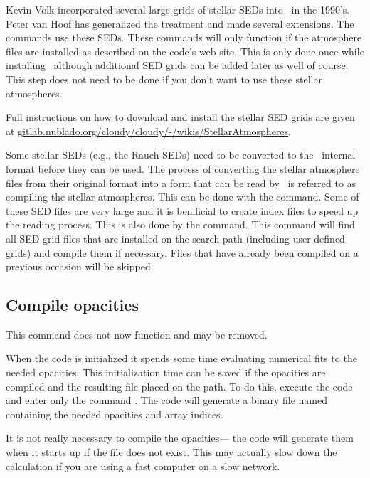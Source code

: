 Kevin Volk incorporated several large grids of stellar SEDs
into \Cloudy\ in the 1990's.
Peter van Hoof has generalized the treatment
and made several extensions.
The  commands use these SEDs.
These commands will only function
if the atmosphere files
are installed as described on the code's web site.
This is only done once
while installing \Cloudy\ although additional SED grids
can be added later as well of course.
This step does not need to be done if
you don't want to use these stellar atmospheres.

Full instructions on how to download and install the stellar SED grids
are given at
\href{https://gitlab.nublado.org/cloudy/cloudy/-/wikis/StellarAtmospheres}{gitlab.nublado.org/cloudy/cloudy/-/wikis/StellarAtmospheres}.

Some stellar SEDs (e.g., the Rauch SEDs) need to be converted to the
\Cloudy\ internal format before they can be used.
The process of converting the
stellar atmosphere files from their original format into a form that can
be read by \Cloudy\ is referred to as compiling the stellar atmospheres.
This can be done with the  command.
Some of these SED files are very large and it is benificial to
create index files to speed up the reading process. This is also done by
the  command. This command will find all
SED grid files that are installed on the search path (including
user-defined grids) and compile them if necessary. Files that have
already been compiled on a previous occasion will be skipped.

\begin{shaded}
\section{Compile opacities}

 This command does not now function and may be removed.

When the code is initialized it spends some time evaluating numerical
fits to the needed opacities.
This initialization time can be saved if
the opacities are compiled and the resulting file placed on the path.
To
do this, execute the code and enter only the command
.
The code will generate a binary file named 
containing the needed opacities and array indices.

  It is not really necessary to compile the opacities---
the code
will generate them when it starts up if the file does not exist.
This may
actually slow down the calculation if you are using a fast computer on a
slow network.
\end{shaded}

